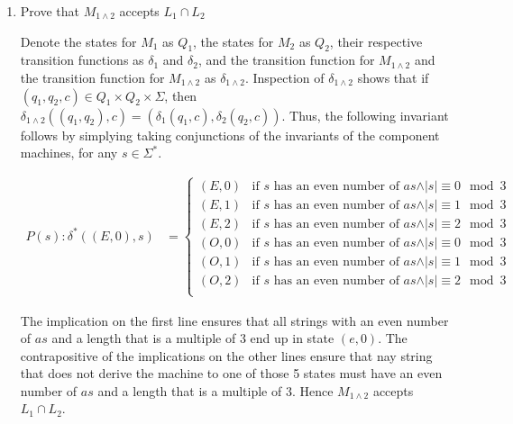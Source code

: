 \documentclass[12pt]{article}
\begin{document}
\begin{enumerate}[1.]
\begin{enumerate}[1.]
\begin{mdframed}
        \end{mdframed}

    \end{enumerate}

    \item Prove that $M_{1\land2}$ accepts $L_1 \cap L_2$

    \bigskip

    Denote the states for $M_1$ as $Q_1$, the states for $M_2$ as $Q_2$, their
    respective transition functions as $\delta_1$ and $\delta_2$, and the transition
    function for $M_{1\land 2}$ and the transition function for $M_{1\land 2}$ as $\delta_{1 \land 2}$.
    Inspection of $\delta_{1 \land 2}$ shows that if $(q_1,q_2,c) \in Q_1 \times Q_2 \times \Sigma$,
    then $\delta_{1\land 2}((q_1,q_2),c) = (\delta_1(q_1,c),\delta_2(q_2,c))$. Thus,
    the following invariant follows by simplying taking conjunctions of the invariants
    of the component machines, for any $s \in \Sigma^*$.

    \begin{align}
        P(s):\delta^*((E,0),s) &= \begin{cases}
            (E,0) & \text{if $s$ has an even number of $as \land \vert s \vert \equiv 0 \mod 3$}\\
            (E,1) & \text{if $s$ has an even number of $as \land \vert s \vert \equiv 1 \mod 3$}\\
            (E,2) & \text{if $s$ has an even number of $as \land \vert s \vert \equiv 2 \mod 3$}\\
            (O,0) & \text{if $s$ has an even number of $as \land \vert s \vert \equiv 0 \mod 3$}\\
            (O,1) & \text{if $s$ has an even number of $as \land \vert s \vert \equiv 1 \mod 3$}\\
            (O,2) & \text{if $s$ has an even number of $as \land \vert s \vert \equiv 2 \mod 3$}\\
        \end{cases}
    \end{align}

    \bigskip

    The implication on the first line ensures that all strings with an even number
    of $as$ and a length that is a multiple of 3 end up in state $(e,0)$. The
    contrapositive of the implications on the other lines ensure that nay string that does
    not derive the machine to one of those 5 states must have an even number of $as$
    and a length that is a multiple of 3. Hence $M_{1 \land 2}$ accepts
    $L_1 \cap L_2$.
    \end{enumerate}
\end{document}
